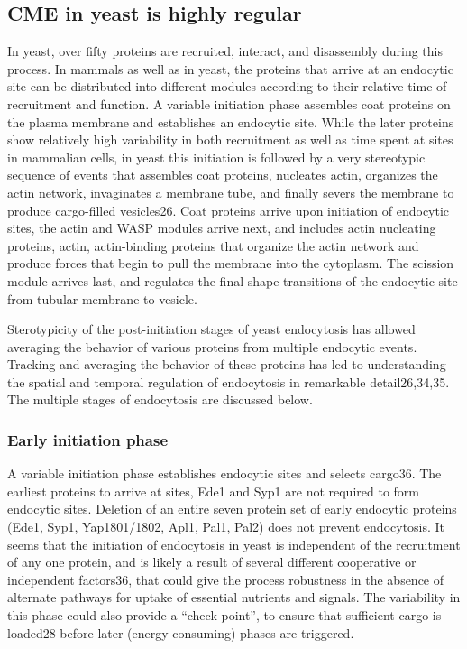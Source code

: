 	
		\subsection{CME in yeast is highly regular}
		In yeast, over fifty proteins are recruited, interact, and disassembly during this process. In mammals as well as in yeast, the proteins that arrive at an endocytic site can be distributed into different modules according to their relative time of recruitment and function. A variable initiation phase assembles coat proteins on the plasma membrane and establishes an endocytic site. While the later proteins show relatively high variability in both recruitment as well as time spent at sites in mammalian cells, in yeast this initiation is followed by a very stereotypic sequence of events that assembles coat proteins, nucleates actin, organizes the actin network, invaginates a membrane tube, and finally severs the membrane to produce cargo-filled vesicles26. Coat proteins arrive upon initiation of endocytic sites, the actin and WASP modules arrive next, and includes actin nucleating proteins, actin, actin-binding proteins that organize the actin network and produce forces that begin to pull the membrane into the cytoplasm. The scission module arrives last, and regulates the final shape transitions of the endocytic site from tubular membrane to vesicle. 

		\vspace{5mm}
		Sterotypicity of the post-initiation stages of yeast endocytosis has allowed averaging the behavior of various proteins from multiple endocytic events. Tracking and averaging the behavior of these proteins has led to understanding the spatial and temporal regulation of endocytosis in remarkable detail26,34,35. The multiple stages of endocytosis are discussed below. 
 


			\subsubsection{Early initiation phase}
			A variable initiation phase establishes endocytic sites and selects cargo36. The earliest proteins to arrive at sites, Ede1 and Syp1 are not required to form endocytic sites. Deletion of an entire seven protein set of early endocytic proteins (Ede1, Syp1, Yap1801/1802, Apl1, Pal1, Pal2) does not prevent endocytosis. It seems that the initiation of endocytosis in yeast is independent of the recruitment of any one protein, and is likely a result of several different cooperative or independent factors36, that could give the process robustness in the absence of alternate pathways for uptake of essential nutrients and signals. The variability in this phase could also provide a “check-point”, to ensure that sufficient cargo is loaded28 before later (energy consuming) phases are triggered. 

